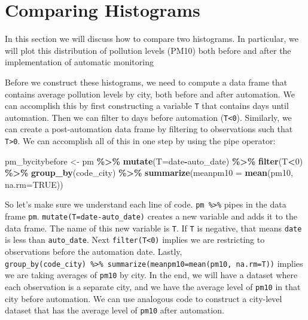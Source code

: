 \documentclass[
]{book}
\newenvironment{Shaded}{\begin{snugshade}}{\end{snugshade}}
\newcommand{\AttributeTok}[1]{\textcolor[rgb]{0.13,0.29,0.53}{#1}}
\newcommand{\ConstantTok}[1]{\textcolor[rgb]{0.56,0.35,0.01}{#1}}
\newcommand{\DecValTok}[1]{\textcolor[rgb]{0.00,0.00,0.81}{#1}}
\newcommand{\FunctionTok}[1]{\textcolor[rgb]{0.13,0.29,0.53}{\textbf{#1}}}
\newcommand{\NormalTok}[1]{#1}
\newcommand{\OtherTok}[1]{\textcolor[rgb]{0.56,0.35,0.01}{#1}}
\newcommand{\SpecialCharTok}[1]{\textcolor[rgb]{0.81,0.36,0.00}{\textbf{#1}}}
\begin{document}
\section{Comparing Histograms}\label{comparing-histograms}

In this section we will discuss how to compare two histograms. In particular, we will plot this distribution of pollution levels (PM10) both before and after the implementation of automatic monitoring

Before we construct these histograms, we need to compute a data frame that contains average pollution levels by city, both before and after automation. We can accomplish this by first constructing a variable \texttt{T} that contains days until automation. Then we can filter to days before automation (\texttt{T\textless{}0}). Similarly, we can create a post-automation data frame by filtering to observations such that \texttt{T\textgreater{}0}. We can accomplish all of this in one step by using the pipe operator:

\begin{Shaded}
\begin{Highlighting}[]
\NormalTok{pm\_bycitybefore }\OtherTok{\textless{}{-}}\NormalTok{ pm }\SpecialCharTok{\%\textgreater{}\%}
  \FunctionTok{mutate}\NormalTok{(}\AttributeTok{T=}\NormalTok{date}\SpecialCharTok{{-}}\NormalTok{auto\_date) }\SpecialCharTok{\%\textgreater{}\%}
  \FunctionTok{filter}\NormalTok{(T}\SpecialCharTok{\textless{}}\DecValTok{0}\NormalTok{) }\SpecialCharTok{\%\textgreater{}\%}
  \FunctionTok{group\_by}\NormalTok{(code\_city) }\SpecialCharTok{\%\textgreater{}\%}
  \FunctionTok{summarize}\NormalTok{(}\AttributeTok{meanpm10 =} \FunctionTok{mean}\NormalTok{(pm10, }\AttributeTok{na.rm=}\ConstantTok{TRUE}\NormalTok{))}
\end{Highlighting}
\end{Shaded}

So let's make sure we understand each line of code. \texttt{pm\ \%\textgreater{}\%} pipes in the data frame \texttt{pm}. \texttt{mutate(T=date-auto\_date)} creates a new variable and adds it to the data frame. The name of this new variable is \texttt{T}. If \texttt{T} is negative, that means \texttt{date} is less than \texttt{auto\_date}. Next \texttt{filter(T\textless{}0)} implies we are restricting to observations before the automation date. Lastly, \texttt{group\_by(code\_city)\ \%\textgreater{}\%\ summarize(meanpm10=mean(pm10,\ na.rm=T))} implies we are taking averages of \texttt{pm10} by city. In the end, we will have a dataset where each observation is a separate city, and we have the average level of \texttt{pm10} in that city before automation. We can use analogous code to construct a city-level dataset that has the average level of \texttt{pm10} after automation.
\end{document}
